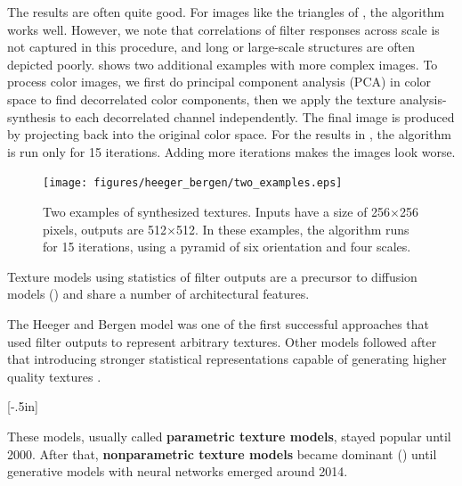 {The results are often quite good.  For images like the triangles of \fig{\ref{fig:analysis_heeger_bergen}}, the algorithm works well. However, we note that correlations of filter responses across scale is not captured in this procedure, and long or large-scale structures are often depicted poorly. \Fig{\ref{fig:two_examples}} shows two additional examples with more complex images. To process color images, we first do principal component analysis (PCA) in color space to find decorrelated color components, then we apply the texture analysis-synthesis to each decorrelated channel independently. The final image is produced by projecting back into the original color space. For the results in \fig{\ref{fig:two_examples}}, the algorithm is run only for 15 iterations. Adding more iterations makes the images look worse. 


\begin{figure}
\centerline{
\texttt{[image: figures/heeger\_bergen/two\_examples.eps]}
}
\caption{Two examples of synthesized textures. Inputs have a size of 256$\times$256 pixels, outputs are 512$\times$512. In these examples, the algorithm runs for 15 iterations, using a pyramid of six orientation and four scales.}
\label{fig:two_examples}
\end{figure}

 Texture models using statistics of filter outputs are a precursor to diffusion models (\sect{\ref{sec:generative_models:diffusion_models}}) and share a number of architectural features.
 
 The Heeger and Bergen model was one of the first successful approaches that used filter outputs to represent arbitrary textures. Other models followed after that introducing stronger statistical representations capable of generating higher quality textures \cite{Portilla2000}. 

  [-.5in]
  
 These models, usually called {\bf parametric texture models}, stayed popular until 2000. 
 After that, {\bf nonparametric texture models} became dominant (\sect{\ref{sect:Efros-Leung_texture}}) until generative models with neural networks emerged around 2014. 




}
